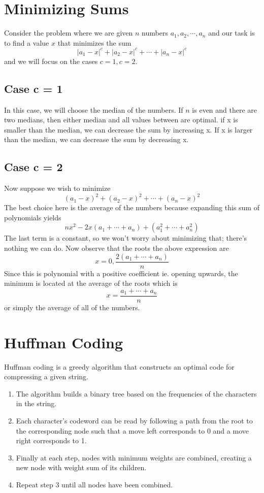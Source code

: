\documentclass[12pt]{scrartcl}
\begin{document}
\section{Minimizing Sums}

Consider the problem where we are given $n$ numbers $a_1, a_2, \cdots, a_n$ 
and our task is to find a value $x$ that minimizes the sum
\[|a_1-x|^c + |a_2-x|^c + \cdots + |a_n-x|^c\]
and we will focus on the cases $c=1, c=2$.

\subsection{Case c = 1}

In this case, we will choose the median of the numbers. 
If $n$ is even and there are two medians, then either median and all values between are optimal.
if x is smaller than the median, we can decrease the sum by increasing x. If x 
is larger than the median, we can decrease the sum by decreasing x.

\subsection{Case c = 2}
Now suppose we wish to minimize 
\[(a_1-x)^2 + (a_2-x)^2 + \cdots + (a_n-x)^2\]
The best choice here is the average of the numbers because expanding this sum of polynomials yields
\[nx^2 - 2x(a_1 + \cdots + a_n) + (a_1^2 + \cdots + a_n^2)\]
The last term is a constant, so we won’t worry about minimizing that; there’s nothing we can do. Now observe that the roots the above expression are
\[x = 0, \frac{2(a_1 + \cdots + a_n)}{n}\]
Since this is polynomial with a positive coefficient ie. opening upwards, the minimum is located at the average of the roots which is 
\[x = \frac{a_1 + \cdots + a_n}{n}\]
or simply the average of all of the numbers.

\section{Huffman Coding}

Huffman coding is a greedy algorithm that constructs an optimal code for compressing a given string.

\begin{enumerate}
\item The algorithm builds a binary tree based on the frequencies of the characters in the string.
\item Each character’s codeword can be read by following a path from the root to the corresponding node such that a move left corresponds to 0 and a move right corresponds to 1.
\item Finally at each step, nodes with minimum weights are combined, creating a new node with weight sum of its children. 
\item Repeat step 3 until all nodes have been combined.
\end{enumerate}
\end{document}
